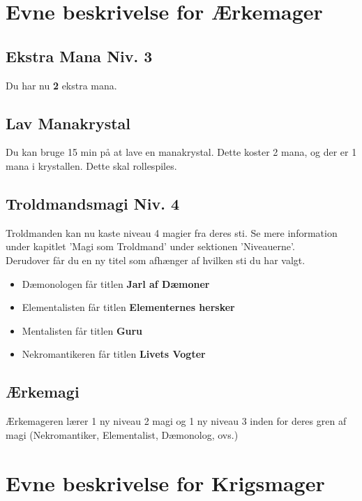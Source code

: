 \section*{Evne beskrivelse for Ærkemager}

\subsection*{Ekstra Mana Niv. 3}
Du har nu \textbf{2} ekstra mana.

\subsection*{Lav Manakrystal}
Du kan bruge 15 min på at lave en manakrystal. Dette koster 2 mana, og der er 1 mana i krystallen. Dette skal rollespiles. 


\subsection*{Troldmandsmagi Niv. 4}
Troldmanden kan nu kaste niveau 4 magier fra deres sti. Se mere information under kapitlet 'Magi som Troldmand' under sektionen 'Niveauerne'. \\
Derudover får du en ny titel som afhænger af hvilken sti du har valgt.\\
\begin{itemize}
    \item Dæmonologen får titlen \textbf{Jarl af Dæmoner}
    \item Elementalisten får titlen \textbf{Elementernes hersker}
    \item Mentalisten får titlen \textbf{Guru}
    \item Nekromantikeren får titlen \textbf{Livets Vogter}
\end{itemize}

\subsection*{Ærkemagi}
Ærkemageren lærer 1 ny niveau 2 magi og 1 ny niveau 3 inden for deres gren af magi (Nekromantiker, Elementalist, Dæmonolog, ovs.)


\section*{Evne beskrivelse for Krigsmager}

